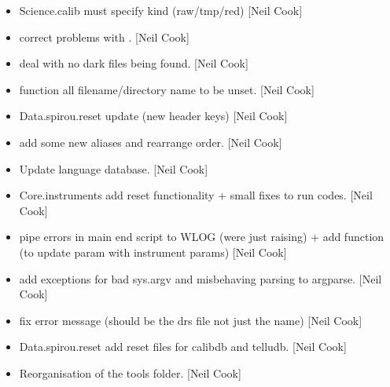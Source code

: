 \documentclass[a4paper,10pt,english]{report}
\begin{document}
\begin{itemize}
\item {} 
Science.calib \sphinxhyphen{}  must specify kind (raw/tmp/red)
{[}Neil Cook{]}

\item {} 
 \sphinxhyphen{} correct problems with . {[}Neil
Cook{]}

\item {} 
 \sphinxhyphen{} deal with no dark files being found. {[}Neil
Cook{]}

\item {} 
 \sphinxhyphen{}  function all filename/directory name
to be unset. {[}Neil Cook{]}

\item {} 
Data.spirou.reset \sphinxhyphen{} update  (new header keys) {[}Neil
Cook{]}

\item {} 
 \sphinxhyphen{} add some new aliases and rearrange order. {[}Neil
Cook{]}

\item {} 
Update language database. {[}Neil Cook{]}

\item {} 
Core.instruments \sphinxhyphen{} add reset functionality + small fixes to run codes.
{[}Neil Cook{]}

\item {} 
 \sphinxhyphen{} pipe errors in main end script to WLOG
(were just raising) + add function  (to update param with
instrument params) {[}Neil Cook{]}

\item {} 
 \sphinxhyphen{} add exceptions for bad sys.argv and
misbehaving parsing to argparse. {[}Neil Cook{]}

\item {} 
 \sphinxhyphen{} fix error message (should be the drs file not
just the name) {[}Neil Cook{]}

\item {} 
Data.spirou.reset \sphinxhyphen{} add reset files for calibdb and telludb. {[}Neil
Cook{]}

\item {} 
Reorganisation of the tools folder. {[}Neil Cook{]}


\end{itemize}
\end{document}
